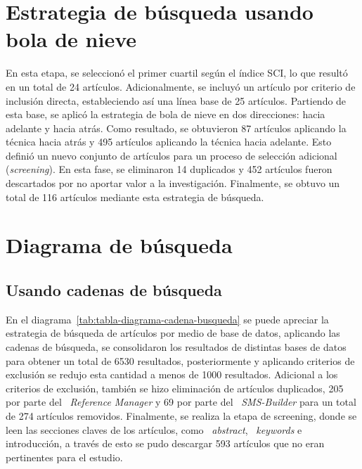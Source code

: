 \section{Estrategia de búsqueda usando bola de nieve}\label{sec:bolaDeNieve}
\noindent
En esta etapa, se seleccionó el primer cuartil según el índice SCI, lo que resultó en un total de 24 artículos. Adicionalmente, se incluyó un artículo por criterio de inclusión directa, estableciendo así una línea base de 25 artículos. 
Partiendo de esta base, se aplicó la estrategia de bola de nieve en dos direcciones: hacia adelante y hacia atrás. Como resultado, se obtuvieron 87 artículos aplicando la técnica hacia atrás y 495 artículos aplicando la técnica hacia adelante.
Esto definió un nuevo conjunto de artículos para un proceso de selección adicional (\textit{screening}). En esta fase, se eliminaron 14 duplicados y 452 artículos fueron descartados por no aportar valor a la investigación.
Finalmente, se obtuvo un total de 116 artículos mediante esta estrategia de búsqueda.

\section{Diagrama de búsqueda}\label{sec:diagramaBusqueda}

\subsection{Usando cadenas de búsqueda}
\noindent
En el diagrama~\ref{tab:tabla-diagrama-cadena-busqueda} se puede apreciar la estrategia de búsqueda de artículos por medio de base de datos, aplicando las cadenas de búsqueda, se consolidaron los resultados de distintas bases de datos para obtener un total de 6530 resultados, posteriormente y aplicando criterios de exclusión se redujo esta cantidad a menos de 1000 resultados. Adicional a los criterios de exclusión, también se hizo eliminación de artículos duplicados, 205 por parte del ~\textit{Reference Manager} y 69 por parte del ~\textit{SMS-Builder} para un total de 274 artículos removidos. Finalmente, se realiza la etapa de screening, donde se leen las secciones claves de los artículos, como ~\textit{abstract}, ~\textit{keywords} e introducción, a través de esto se pudo descargar 593 artículos que no eran pertinentes para el estudio.
\label{img:busqueda-bd}

